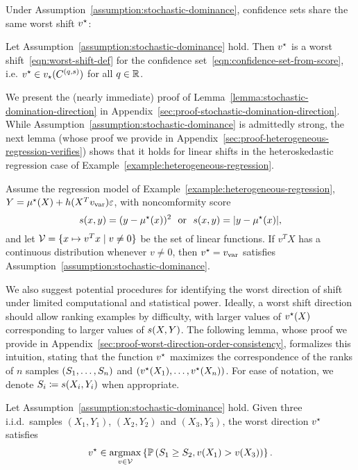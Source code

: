 Under Assumption~\ref{assumption:stochastic-dominance}, confidence sets share the same worst shift $v^\star$:
\begin{lemma}
  \label{lemma:stochastic-domination-direction}
  Let Assumption~\ref{assumption:stochastic-dominance} hold. Then $v^\star$ is a worst shift~\eqref{eqn:worst-shift-def} for the confidence set~\eqref{eqn:confidence-set-from-score}, i.e. $v^\star \in v_\star(C^{(q, s)})$ for all $q \in \mathbb{R}$.
\end{lemma}
\noindent
We present the (nearly immediate) proof of
Lemma~\ref{lemma:stochastic-domination-direction} in
Appendix~\ref{sec:proof-stochastic-domination-direction}.
While Assumption~\ref{assumption:stochastic-dominance}
is admittedly strong, the next lemma (whose proof we provide in
Appendix~\ref{sec:proof-heterogeneous-regression-verifies}) shows
that it holds for linear shifts in the heteroskedastic regression
case of Example~\ref{example:heterogeneous-regression}.
\begin{lemma}
  \label{lemma:heterogeneous-regression-verifies}
  Assume the regression model of
  Example~\ref{example:heterogeneous-regression},
  $Y = \mu^\star(X) + h(X^T v_{\textup{var}}) \varepsilon$,
  with noncomformity score
  \begin{equation*}
    s(x, y) = (y - \mu^\star(x))^2
    ~~ \mbox{or} ~~
    s(x, y) = |y - \mu^\star(x)|,
  \end{equation*}
  and let $\mathcal{V} = \{ x \mapsto v^T x \mid v \neq 0\}$ be the set
  of linear functions.  If $v^T X$ has a continuous distribution whenever $v
  \neq 0$, then $v^\star = v_{\textup{var}}$ satisfies
  Assumption~\ref{assumption:stochastic-dominance}.
\end{lemma}

We also suggest potential procedures for identifying the worst direction of
shift under limited computational and statistical power.  Ideally, a worst
shift direction should allow ranking examples by difficulty, with larger
values of $v^\star(X)$ corresponding to larger values of $s(X,Y)$.  The
following lemma, whose proof we provide in
Appendix~\ref{sec:proof-worst-direction-order-consistency}, formalizes this
intuition, stating that the function $v^\star$ maximizes the correspondence of
the ranks of $n$ samples $(S_1, \dots, S_n)$ and $(v^\star(X_1),
\dots, v^\star(X_n))$.  For ease of notation, we denote $S_i \coloneqq
s(X_i,Y_i)$ when appropriate.

\begin{lemma}
  \label{lemma:worst-direction-order-consistency}
  Let Assumption~\ref{assumption:stochastic-dominance} hold.  Given three
  i.i.d.\ samples $(X_1,Y_1)$, $(X_2, Y_2)$ and $(X_3, Y_3)$, the worst
  direction $v^\star$ satisfies
  \begin{align}
    \label{eqn:worst-direction-order-consistency}
    v^\star \in \mathop{\rm argmax}_{v \in \mathcal{V}} \left\{ \mathbb{P}\left( S_1 \ge S_2,  v(X_1) > v(X_3) \right) \right\}.
  \end{align}
\end{lemma}

